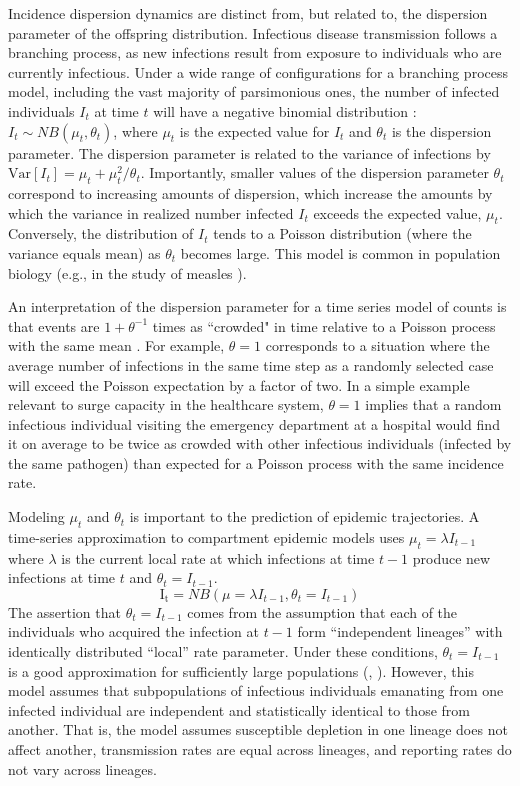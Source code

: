 \documentclass[10pt,letterpaper]{article}
\begin{document}
Incidence dispersion dynamics are distinct from, but related to, the dispersion parameter of the offspring distribution. 
Infectious disease transmission follows a branching process, as new infections result from exposure to individuals who are currently infectious. 
Under a wide range of configurations for a branching process model, including the vast majority of parsimonious ones, the number of infected individuals $I_t$ at time $t$ will have a negative binomial distribution \cite{kendall_stochastic_1949}: $I_t \sim NB \left( \mu_t, \theta_t \right)$, where $\mu_t$ is the expected value for $I_t$ and $\theta_t$ is the dispersion parameter. 
The dispersion parameter is related to the variance of infections by $\mathrm{Var}[I_t] = \mu_t + \mu_t^2 / \theta_t$. 
Importantly, smaller values of the dispersion parameter $\theta_t$ correspond to increasing amounts of dispersion, which increase the amounts by which the variance in realized number infected $I_t$ exceeds the expected value, $\mu_t$. 
Conversely, the distribution of $I_t$ tends to a Poisson distribution (where the variance equals mean) as $\theta_t$ becomes large. 
This model is common in population biology (e.g., in the study of measles \cite{grenfell_dynamics_2002}).

An interpretation of the dispersion parameter for a time series model of counts is that events are $1 + \theta^{-1}$ times as ``crowded" in time relative to a Poisson process with the same mean \cite{lloyd_mean_1967}. 
For example, $\theta = 1$ corresponds to a situation where the average number of infections in the same time step as a randomly selected case will exceed the Poisson expectation by a factor of two. 
In a simple example relevant to surge capacity in the healthcare system, $\theta = 1$ implies that a random infectious individual visiting the emergency department at a hospital would find it on average to be twice as crowded with other infectious individuals (infected by the same pathogen) than expected for a Poisson process with the same incidence rate.

Modeling $\mu_t$ and $\theta_t$ is important to the prediction of epidemic trajectories. A time-series approximation to compartment epidemic models uses $\mu_t = \lambda I_{t-1}$ where $\lambda$ is the current local rate at which infections at time $t-1$ produce new infections at time $t$ and $\theta_t = I_{t-1}$. 
\begin{equation}
    \mathrm{I_t} = NB(\mu = \lambda I_{t-1}, \theta_t = I_{t-1})
\end{equation}
The assertion that $\theta_t = I_{t-1}$ comes from the assumption that each of the individuals who acquired the infection at $t-1$ form ``independent lineages'' with identically distributed ``local'' rate parameter. 
Under these conditions, $\theta_t = I_{t-1}$ is a good approximation for sufficiently large populations (\cite{kendall_stochastic_1949}, \cite{bjornstad_dynamics_nodate}). 
However, this model assumes that subpopulations of infectious individuals emanating from one infected individual are independent and statistically identical to those from another. 
That is, the model assumes susceptible depletion in one lineage does not affect another, transmission rates are equal across lineages, and reporting rates do not vary across lineages. 
\end{document}
